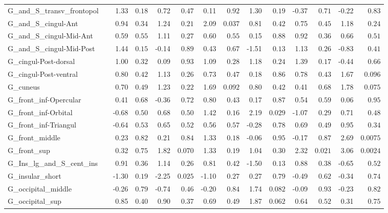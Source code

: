 {\begin{longtable}{llrrrrrrrrrrrr}
G\_and\_S\_transv\_frontopol &  & 1.33 & $0.18$ & 0.72 & $0.47$ & 0.11 & $0.92$ & 1.30 & $0.19$ & -0.37 & $0.71$ & -0.22 & $0.83$ \\
G\_and\_S\_cingul-Ant &  & 0.94 & $0.34$ & 1.24 & $0.21$ & 2.09 & $0.037$ & 0.81 & $0.42$ & 0.75 & $0.45$ & 1.18 & $0.24$ \\
G\_and\_S\_cingul-Mid-Ant &  & 0.59 & $0.55$ & 1.11 & $0.27$ & 0.60 & $0.55$ & 0.15 & $0.88$ & 0.92 & $0.36$ & 0.66 & $0.51$ \\
G\_and\_S\_cingul-Mid-Post &  & 1.44 & $0.15$ & -0.14 & $0.89$ & 0.43 & $0.67$ & -1.51 & $0.13$ & 1.13 & $0.26$ & -0.83 & $0.41$ \\
G\_cingul-Post-dorsal &  & 1.00 & $0.32$ & 0.09 & $0.93$ & 1.09 & $0.28$ & 1.18 & $0.24$ & 1.39 & $0.17$ & -0.44 & $0.66$ \\
G\_cingul-Post-ventral &  & 0.80 & $0.42$ & 1.13 & $0.26$ & 0.73 & $0.47$ & 0.18 & $0.86$ & 0.78 & $0.43$ & 1.67 & $0.096$ \\
G\_cuneus &  & 0.70 & $0.49$ & 1.23 & $0.22$ & 1.69 & $0.092$ & 0.80 & $0.42$ & 0.41 & $0.68$ & 1.78 & $0.075$ \\
G\_front\_inf-Opercular &  & 0.41 & $0.68$ & -0.36 & $0.72$ & 0.80 & $0.43$ & 0.17 & $0.87$ & 0.54 & $0.59$ & 0.06 & $0.95$ \\
G\_front\_inf-Orbital &  & -0.68 & $0.50$ & 0.68 & $0.50$ & 1.42 & $0.16$ & 2.19 & $0.029$ & -1.07 & $0.29$ & 0.71 & $0.48$ \\
G\_front\_inf-Triangul &  & -0.64 & $0.53$ & 0.65 & $0.52$ & 0.56 & $0.57$ & -0.28 & $0.78$ & 0.69 & $0.49$ & 0.95 & $0.34$ \\
G\_front\_middle &  & 0.23 & $0.82$ & 0.21 & $0.84$ & 1.33 & $0.18$ & -0.06 & $0.95$ & -0.17 & $0.87$ & 2.69 & $0.0075$ \\
G\_front\_sup &  & 0.32 & $0.75$ & 1.82 & $0.070$ & 1.33 & $0.19$ & 1.04 & $0.30$ & 2.32 & $0.021$ & 3.06 & $0.0024$ \\
G\_Ins\_lg\_and\_S\_cent\_ins &  & 0.91 & $0.36$ & 1.14 & $0.26$ & 0.81 & $0.42$ & -1.50 & $0.13$ & 0.88 & $0.38$ & -0.65 & $0.52$ \\
G\_insular\_short &  & -1.30 & $0.19$ & -2.25 & $0.025$ & -1.10 & $0.27$ & 0.27 & $0.79$ & -0.49 & $0.62$ & -0.34 & $0.74$ \\
G\_occipital\_middle &  & -0.26 & $0.79$ & -0.74 & $0.46$ & -0.20 & $0.84$ & 1.74 & $0.082$ & -0.09 & $0.93$ & -0.23 & $0.82$ \\
G\_occipital\_sup &  & 0.85 & $0.40$ & 0.90 & $0.37$ & 0.69 & $0.49$ & 1.87 & $0.062$ & 0.64 & $0.52$ & 0.31 & $0.75$ \\

\end{longtable}}
